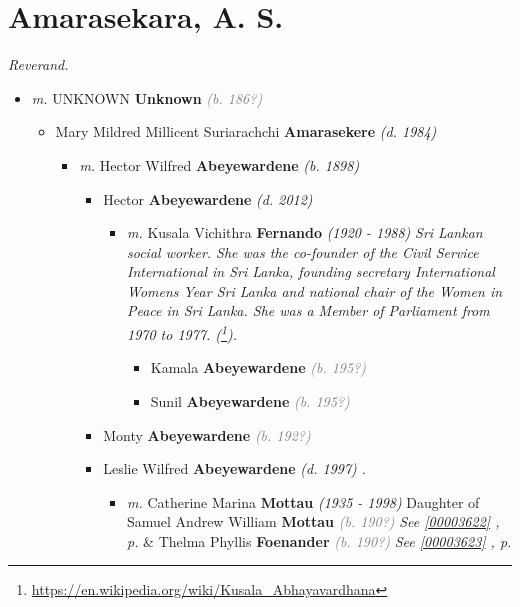 \documentclass[10pt, openany]{book}
\begin{document}
\chapter{Amarasekara, A. S.}
\label{00000060}
\textcolor{slmaroon}{\textit{Reverand.}}
\begin{itemize}
\item{\textit{m.} UNKNOWN \textbf{Unknown} \textcolor{gray}{\textit{(b. 186?)}}   \label{couple:00000060:00003699} \begin{itemize}
\item{Mary Mildred Millicent Suriarachchi \textbf{Amarasekere} \textcolor{slorange}{\textit{(d. 1984)}}
\begin{itemize}
\item{\textit{m.} Hector Wilfred \textbf{Abeyewardene} \textcolor{slorange}{\textit{(b. 1898)}}   \label{couple:00003601:00003616} \begin{itemize}
\item{Hector \textbf{Abeyewardene} \textcolor{slorange}{\textit{(d. 2012)}}
\begin{itemize}
\item{\textit{m.} Kusala Vichithra \textbf{Fernando} \textcolor{slorange}{\textit{(1920 - 1988)}} \textcolor{slmaroon}{\textit{Sri Lankan social worker. She was the co-founder of the Civil Service International in Sri Lanka, founding secretary International Womens Year Sri Lanka and national chair of the Women in Peace in Sri Lanka. She was a Member of Parliament from 1970 to 1977. (\footnote{\url{https://en.wikipedia.org/wiki/Kusala_Abhayavardhana}}).}}   \label{couple:00003602:00003617} \begin{itemize}
\item{Kamala \textbf{Abeyewardene} \textcolor{gray}{\textit{(b. 195?)}}
 }
\item{Sunil \textbf{Abeyewardene} \textcolor{gray}{\textit{(b. 195?)}}
 }
\end{itemize}}
\end{itemize}
 }
\item{Monty \textbf{Abeyewardene} \textcolor{gray}{\textit{(b. 192?)}}
 }
\item{Leslie Wilfred  \textbf{Abeyewardene} \textcolor{slorange}{\textit{(d. 1997)}} \textcolor{slmaroon}{\textit{.}}
\begin{itemize}
\item{\textit{m.} Catherine Marina \textbf{Mottau} \textcolor{slorange}{\textit{(1935 - 1998)}} Daughter of  Samuel Andrew William \textbf{Mottau} \textcolor{gray}{\textit{(b. 190?)}} \textcolor{slteal}{\textit{See  \autoref{00003622} \textit{, p. \pageref{00003622} }}}  \&  Thelma Phyllis \textbf{Foenander} \textcolor{gray}{\textit{(b. 190?)}} \textcolor{slteal}{\textit{See  \autoref{00003623} \textit{, p. \pageref{00003623} }}}   \label{couple:00003613:00003621} \begin{itemize}

\end{itemize}}
\end{itemize}}
\end{itemize}}
\end{itemize}}
\end{itemize}}
\end{itemize}
\end{document}
